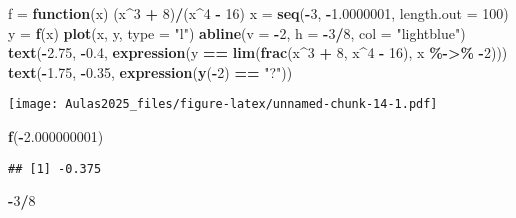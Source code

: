 \documentclass[
]{book}
\newenvironment{Shaded}{\begin{snugshade}}{\end{snugshade}}
\newcommand{\AttributeTok}[1]{\textcolor[rgb]{0.13,0.29,0.53}{#1}}
\newcommand{\ControlFlowTok}[1]{\textcolor[rgb]{0.13,0.29,0.53}{\textbf{#1}}}
\newcommand{\DecValTok}[1]{\textcolor[rgb]{0.00,0.00,0.81}{#1}}
\newcommand{\FloatTok}[1]{\textcolor[rgb]{0.00,0.00,0.81}{#1}}
\newcommand{\FunctionTok}[1]{\textcolor[rgb]{0.13,0.29,0.53}{\textbf{#1}}}
\newcommand{\NormalTok}[1]{#1}
\newcommand{\OtherTok}[1]{\textcolor[rgb]{0.56,0.35,0.01}{#1}}
\newcommand{\SpecialCharTok}[1]{\textcolor[rgb]{0.81,0.36,0.00}{\textbf{#1}}}
\newcommand{\StringTok}[1]{\textcolor[rgb]{0.31,0.60,0.02}{#1}}
\begin{document}
\begin{Shaded}
\begin{Highlighting}[]
\NormalTok{f }\OtherTok{=} \ControlFlowTok{function}\NormalTok{(x) (x}\SpecialCharTok{\^{}}\DecValTok{3} \SpecialCharTok{+} \DecValTok{8}\NormalTok{)}\SpecialCharTok{/}\NormalTok{(x}\SpecialCharTok{\^{}}\DecValTok{4} \SpecialCharTok{{-}} \DecValTok{16}\NormalTok{)}
\NormalTok{x }\OtherTok{=} \FunctionTok{seq}\NormalTok{(}\SpecialCharTok{{-}}\DecValTok{3}\NormalTok{, }\SpecialCharTok{{-}}\FloatTok{1.0000001}\NormalTok{, }\AttributeTok{length.out =} \DecValTok{100}\NormalTok{)}
\NormalTok{y }\OtherTok{=} \FunctionTok{f}\NormalTok{(x)}
\FunctionTok{plot}\NormalTok{(x, y, }\AttributeTok{type =} \StringTok{"l"}\NormalTok{)}
\FunctionTok{abline}\NormalTok{(}\AttributeTok{v =} \SpecialCharTok{{-}}\DecValTok{2}\NormalTok{, }\AttributeTok{h =} \SpecialCharTok{{-}}\DecValTok{3}\SpecialCharTok{/}\DecValTok{8}\NormalTok{, }\AttributeTok{col =} \StringTok{"lightblue"}\NormalTok{)}
\FunctionTok{text}\NormalTok{(}\SpecialCharTok{{-}}\FloatTok{2.75}\NormalTok{, }\SpecialCharTok{{-}}\FloatTok{0.4}\NormalTok{, }\FunctionTok{expression}\NormalTok{(y }\SpecialCharTok{==} \FunctionTok{lim}\NormalTok{(}\FunctionTok{frac}\NormalTok{(x}\SpecialCharTok{\^{}}\DecValTok{3} \SpecialCharTok{+} \DecValTok{8}\NormalTok{, x}\SpecialCharTok{\^{}}\DecValTok{4} \SpecialCharTok{{-}} \DecValTok{16}\NormalTok{),}
\NormalTok{    x }\SpecialCharTok{\%{-}\textgreater{}\%} \SpecialCharTok{{-}}\DecValTok{2}\NormalTok{)))}
\FunctionTok{text}\NormalTok{(}\SpecialCharTok{{-}}\FloatTok{1.75}\NormalTok{, }\SpecialCharTok{{-}}\FloatTok{0.35}\NormalTok{, }\FunctionTok{expression}\NormalTok{(}\FunctionTok{y}\NormalTok{(}\SpecialCharTok{{-}}\DecValTok{2}\NormalTok{) }\SpecialCharTok{==} \StringTok{"?"}\NormalTok{))}
\end{Highlighting}
\end{Shaded}

\texttt{[image: Aulas2025\_files/figure-latex/unnamed-chunk-14-1.pdf]}

\begin{Shaded}
\begin{Highlighting}[]
\FunctionTok{f}\NormalTok{(}\SpecialCharTok{{-}}\FloatTok{2.000000001}\NormalTok{)}
\end{Highlighting}
\end{Shaded}

\begin{verbatim}
## [1] -0.375
\end{verbatim}

\begin{Shaded}
\begin{Highlighting}[]
\SpecialCharTok{{-}}\DecValTok{3}\SpecialCharTok{/}\DecValTok{8}
\end{Highlighting}
\end{Shaded}
\end{document}
